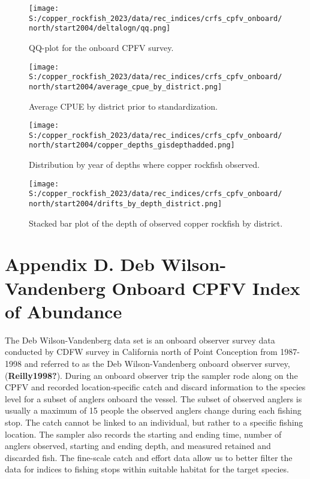 \documentclass[11pt,
  english,
  letterpaper,
]{article}
\begin{document}
\newpage

\begin{figure}
\centering
\texttt{[image: S:/copper\_rockfish\_2023/data/rec\_indices/crfs\_cpfv\_onboard/north/start2004/deltalogn/qq.png]}
\caption{QQ-plot for the onboard CPFV survey.\label{fig:onboard-qq}}
\end{figure}

\newpage

\begin{figure}
\centering
\texttt{[image: S:/copper\_rockfish\_2023/data/rec\_indices/crfs\_cpfv\_onboard/north/start2004/average\_cpue\_by\_district.png]}
\caption{Average CPUE by district prior to standardization.\label{fig:onboard-regioncpue}}
\end{figure}

\newpage

\begin{figure}
\centering
\texttt{[image: S:/copper\_rockfish\_2023/data/rec\_indices/crfs\_cpfv\_onboard/north/start2004/copper\_depths\_gisdepthadded.png]}
\caption{Distribution by year of depths where copper rockfish observed.\label{fig:onboard-depths}}
\end{figure}

\newpage

\begin{figure}
\centering
\texttt{[image: S:/copper\_rockfish\_2023/data/rec\_indices/crfs\_cpfv\_onboard/north/start2004/drifts\_by\_depth\_district.png]}
\caption{Stacked bar plot of the depth of observed copper rockfish by district.\label{fig:onboard-depths}}
\end{figure}

\newpage

\hypertarget{dwv-cpfv-index}{%
\section{Appendix D. Deb Wilson-Vandenberg Onboard CPFV Index of Abundance}\label{dwv-cpfv-index}}

The Deb Wilson-Vandenberg data set is an onboard observer survey data conducted by CDFW survey in California north of Point Conception from 1987-1998 and referred to as the Deb Wilson-Vandenberg onboard observer survey, (\textbf{Reilly1998?}). During an onboard observer trip the sampler rode along on the CPFV and recorded location-specific catch and discard information to the species level for a subset of anglers onboard the vessel. The subset of observed anglers is usually a maximum of 15 people the observed anglers change during each fishing stop. The catch cannot be linked to an individual, but rather to a specific fishing location. The sampler also records the starting and ending time, number of anglers observed, starting and ending depth, and measured retained and discarded fish. The fine-scale catch and effort data allow us to better filter the data for indices to fishing stops within suitable habitat for the target species.
\end{document}
